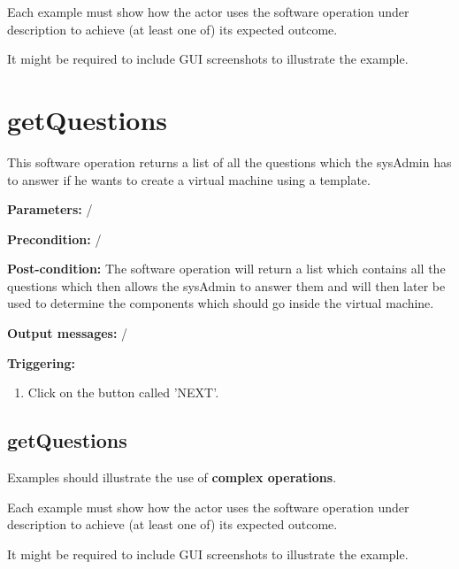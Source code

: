 Each example must show how the actor uses the software operation under
description to achieve (at least one of) its expected outcome.

It might be required to include GUI screenshots to illustrate the example.








\section{getQuestions}
\label{operation:getQuestions}
This software operation returns a list of all the questions which the sysAdmin
has to answer if he wants to create a virtual machine using a template.
\begin{description}

\item \textbf{Parameters:} /
\item \textbf{Precondition:} /
\item \textbf{Post-condition:} The software operation will return a list which
contains all the questions which then allows the sysAdmin to answer them and
will then later be used to determine the components which should go inside the
virtual machine.
\item \textbf{Output messages:} /

\item \textbf{Triggering:}
\begin{enumerate}
\item Click on the button called 'NEXT'.
\end{enumerate}

 
\end{description}

\subsection{getQuestions}
Examples should illustrate the use of \textbf{complex operations}.

Each example must show how the actor uses the software operation under
description to achieve (at least one of) its expected outcome.

It might be required to include GUI screenshots to illustrate the example.









